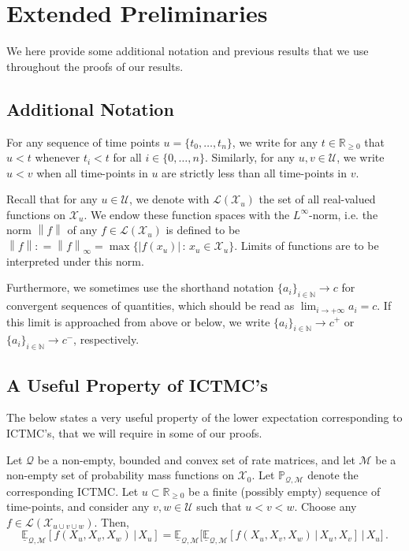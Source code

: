 \documentclass[twoside,11pt]{article}
\newcommand{\nats}{\mathbb{N}}
\newcommand{\reals}{\mathbb{R}}
\newcommand{\realsnonneg}{\reals_{\geq 0}}
\newcommand{\states}{\mathcal{X}}
\newcommand{\lexp}{\underline{\mathbb{E}}_{\rateset,\mathcal{M}}}
\newcommand{\gambles}{\mathcal{L}}
\newcommand{\rateset}{\mathcal{Q}}
\newcommand{\norm}[1]{\left\lVert #1 \right\rVert}
\newcommand{\abs}[1]{\left\vert #1 \right\vert}
\newcommand{\coloneqq}{:\!=}
\begin{document}
\appendix
{}

%


\newpage


\section{Extended Preliminaries}

We here provide some additional notation and previous results that we use throughout the proofs of our results.

\subsection{Additional Notation}

For any sequence of time points $u=\{t_0,\ldots,t_n\}$, we write for any $t\in\realsnonneg$ that $u<t$ whenever $t_i<t$ for all $i\in\{0,\ldots,n\}$. Similarly, for any $u,v\in\mathcal{U}$, we write $u< v$ when all time-points in $u$ are strictly less than all time-points in $v$.

Recall that for any $u\in\mathcal{U}$, we denote with $\gambles(\states_u)$ the set of all real-valued functions on $\states_u$. We endow these function spaces with the $L^\infty$-norm, i.e. the norm $\norm{f}$ of any $f\in\gambles(\states_u)$ is defined to be $\norm{f}\coloneqq\norm{f}_\infty=\max\{\abs{f(x_u)}\,:\,x_u\in\states_u\}$. Limits of functions are to be interpreted under this norm.

Furthermore, we sometimes use the shorthand notation $\{a_i\}_{i\in\nats}\to c$ for convergent sequences of quantities, which should be read as $\lim_{i\to+\infty}a_i=c$. If this limit is approached from above or below, we write $\{a_i\}_{i\in\nats}\to c^+$ or $\{a_i\}_{i\in\nats}\to c^-$, respectively.

\subsection{A Useful Property of ICTMC's}

The below states a very useful property of the lower expectation corresponding to ICTMC's, that we will require in some of our proofs.

\begin{lemma}\cite[Theorem 6.5]{krak2016ictmc}\label{lemma:iterated_lower}
Let $\rateset$ be a non-empty, bounded and convex set of rate matrices, and let $\mathcal{M}$ be a non-empty set of probability mass functions on $\states_0$. Let $\mathbb{P}_{\rateset,\mathcal{M}}$ denote the corresponding ICTMC.
Let $u\subset\realsnonneg$ be a finite (possibly empty) sequence of time-points, and consider any $v,w\in\mathcal{U}$ such that $u<v<w$. Choose any $f\in\gambles(\states_{u\cup v\cup w})$. Then,
\begin{equation*}
\lexp[f(X_u,X_v,X_w)\,\vert\,X_u] = \lexp\bigl[\lexp[f(X_u,X_v,X_w)\,\vert\,X_u,X_v]\,\vert\,X_u\bigr]\,.
\end{equation*}
\end{lemma}
\end{document}
